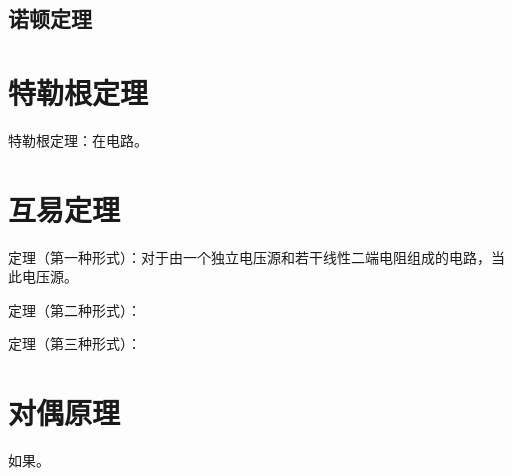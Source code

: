 \subsection{诺顿定理}

\section{特勒根定理}
特勒根定理：在电路。

\section{互易定理}
定理（第一种形式）：对于由一个独立电压源和若干线性二端电阻组成的电路，当此电压源。

定理（第二种形式）：

定理（第三种形式）：

\section{对偶原理}
如果。

\endinput